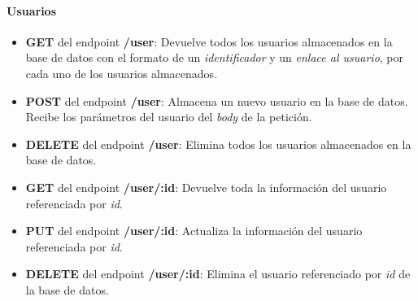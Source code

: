 \documentclass[a4paper]{article}
\begin{document}
\paragraph{Usuarios}
\begin{itemize}
	\item \textbf{GET} del endpoint \textbf{/user}: Devuelve todos los usuarios almacenados en la base de datos con el formato de un \textit{identificador} y un \textit{enlace al usuario}, por cada uno de los usuarios almacenados.
	\item \textbf{POST} del endpoint \textbf{/user}:  
	Almacena un nuevo usuario en la base de datos. Recibe los parámetros del usuario del \textit{body} de la petición.
	\item \textbf{DELETE} del endpoint \textbf{/user}: Elimina todos los usuarios almacenados en la base de datos.
	\item \textbf{GET} del endpoint \textbf{/user/:id}: Devuelve toda la información del usuario referenciada por \textit{id}.
	\item \textbf{PUT} del endpoint \textbf{/user/:id}: Actualiza la información del usuario referenciada por \textit{id}.
	\item \textbf{DELETE} del endpoint \textbf{/user/:id}: Elimina el usuario referenciado por \textit{id} de la base de datos.
\end{itemize}
\end{document}
